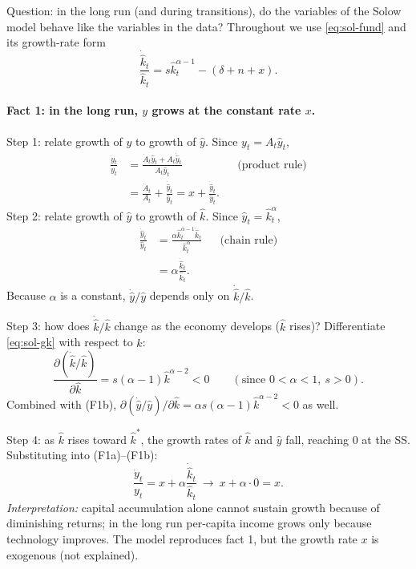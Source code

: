 Question: in the long run (and during transitions), do the variables of the Solow model behave like the variables in the data? Throughout we use \eqref{eq:sol-fund} and its growth-rate form
\begin{equation}\label{eq:sol-gk}
\frac{\dot{\hat k}_t}{\hat k_t}=s\hat k_t^{\alpha-1}-(\delta+n+x).
\end{equation}

\paragraph{Fact 1: in the long run, $y$ grows at the constant rate $x$.}
Step 1: relate growth of $y$ to growth of $\hat y$. Since $y_t=A_t\hat y_t$,
\begin{align*}
\frac{\dot y_t}{y_t} &= \frac{\dot A_t\hat y_t + A_t\dot{\hat y}_t}{A_t\hat y_t} && \text{(product rule)}\\
&= \frac{\dot A_t}{A_t} + \frac{\dot{\hat y}_t}{\hat y_t} = x + \frac{\dot{\hat y}_t}{\hat y_t}. \tag{F1a}
\end{align*}
Step 2: relate growth of $\hat y$ to growth of $\hat k$. Since $\hat y_t=\hat k_t^{\alpha}$,
\begin{align*}
\frac{\dot{\hat y}_t}{\hat y_t} &= \frac{\alpha\hat k_t^{\alpha-1}\dot{\hat k}_t}{\hat k_t^{\alpha}} && \text{(chain rule)}\\
&= \alpha\frac{\dot{\hat k}_t}{\hat k_t}. \tag{F1b}
\end{align*}
Because $\alpha$ is a constant, $\dot{\hat y}/\hat y$ depends only on $\dot{\hat k}/\hat k$.

Step 3: how does $\dot{\hat k}/\hat k$ change as the economy develops ($\hat k$ rises)? Differentiate \eqref{eq:sol-gk} with respect to $\hat k$:
\[
\frac{\partial(\dot{\hat k}/\hat k)}{\partial\hat k}=s(\alpha-1)\hat k^{\alpha-2}<0\qquad(\text{since }0<\alpha<1,\ s>0).
\]
Combined with (F1b), $\partial(\dot{\hat y}/\hat y)/\partial\hat k = \alpha s(\alpha-1)\hat k^{\alpha-2}<0$ as well.

Step 4: as $\hat k$ rises toward $\hat k^*$, the growth rates of $\hat k$ and $\hat y$ fall, reaching $0$ at the SS. Substituting into (F1a)--(F1b):
\[
\frac{\dot y_t}{y_t} = x+\alpha\frac{\dot{\hat k}_t}{\hat k_t}\ \longrightarrow\ x+\alpha\cdot 0 = x .
\]
\textit{Interpretation:} capital accumulation alone cannot sustain growth because of diminishing returns; in the long run per-capita income grows only because technology improves. The model reproduces fact 1, but the growth rate $x$ is exogenous (not explained).

